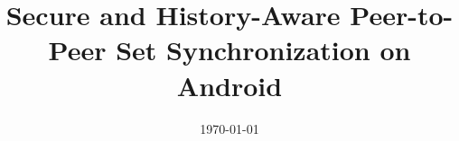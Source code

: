 \documentclass[a4paper, 10pt, oneside]{memoir}
\title				{Secure and History-Aware Peer-to-Peer Set 		Synchronization on Android}
\date				{\today}
\begin{document}

\thesisfront
\maketitle
\pagestyle{thesis}
% 

\thesistoc
\thesismain




%
%
%
\thesisappendix
\thesisbib
\begin{appendices}
	 
\end{appendices}
\thesisback

\end{document}
